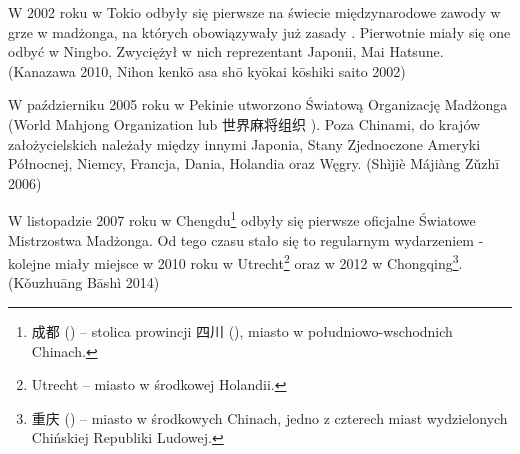 W 2002 roku w Tokio odbyły się pierwsze na świecie międzynarodowe zawody w grze
w madżonga, na których obowiązywały już zasady .
Pierwotnie miały się one odbyć w Ningbo. Zwyciężył w nich reprezentant Japonii,
Mai Hatsune. (Kanazawa 2010, Nihon kenkō asa shō kyōkai kōshiki saito 2002)

W październiku 2005 roku w Pekinie utworzono Światową Organizację Madżonga
(World Mahjong Organization lub 世界麻将组织 ).
Poza Chinami, do krajów założycielskich należały między innymi Japonia, Stany
Zjednoczone Ameryki Północnej, Niemcy, Francja, Dania, Holandia oraz Węgry.
(Shìjiè Májiàng Zǔzhī 2006)

W listopadzie 2007 roku w Chengdu\footnote{成都 () -- stolica
prowincji 四川 (), miasto w południowo-wschodnich Chinach.} odbyły
się pierwsze oficjalne Światowe Mistrzostwa Madżonga. Od tego czasu stało się to
regularnym wydarzeniem - kolejne miały miejsce w 2010 roku w
Utrecht\footnote{Utrecht --  miasto w środkowej Holandii.} oraz w 2012 w
Chongqing\footnote{重庆 () -- miasto w środkowych Chinach, jedno
z czterech miast wydzielonych Chińskiej Republiki Ludowej.}. (Kǒuzhuāng Bāshì
2014)






 














